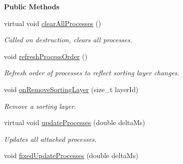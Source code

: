 \begin{Indent}\textbf{ Public Methods}\par
\begin{DoxyCompactItemize}
\item 
\mbox{\label{classrev_1_1_process_queue_a4b36611b55717c4c116ce7f7e98d6d6e}} 
virtual void \mbox{\hyperlink{classrev_1_1_process_queue_a4b36611b55717c4c116ce7f7e98d6d6e}{clear\+All\+Processes}} ()
\begin{DoxyCompactList}\small\item\em Called on destruction, clears all processes. \end{DoxyCompactList}\item 
\mbox{\label{classrev_1_1_process_queue_a0eb83dd3c55e487729378c23bff10746}} 
void \mbox{\hyperlink{classrev_1_1_process_queue_a0eb83dd3c55e487729378c23bff10746}{refresh\+Process\+Order}} ()
\begin{DoxyCompactList}\small\item\em Refresh order of processes to reflect sorting layer changes. \end{DoxyCompactList}\item 
\mbox{\label{classrev_1_1_process_queue_aaac900cb3c10e9934401c41d230e5bf5}} 
void \mbox{\hyperlink{classrev_1_1_process_queue_aaac900cb3c10e9934401c41d230e5bf5}{on\+Remove\+Sorting\+Layer}} (size\+\_\+t layer\+Id)
\begin{DoxyCompactList}\small\item\em Remove a sorting layer. \end{DoxyCompactList}\item 
\mbox{\label{classrev_1_1_process_queue_ac8e03c241dfb5b61205de15e57e7e8c3}} 
virtual void \mbox{\hyperlink{classrev_1_1_process_queue_ac8e03c241dfb5b61205de15e57e7e8c3}{update\+Processes}} (double delta\+Ms)
\begin{DoxyCompactList}\small\item\em Updates all attached processes. \end{DoxyCompactList}\item 
\mbox{\label{classrev_1_1_process_queue_af6ff92d7ee013b027965e1646b995857}} 
void \mbox{\hyperlink{classrev_1_1_process_queue_af6ff92d7ee013b027965e1646b995857}{fixed\+Update\+Processes}} (double delta\+Ms)

\end{DoxyCompactItemize}
\end{Indent}

